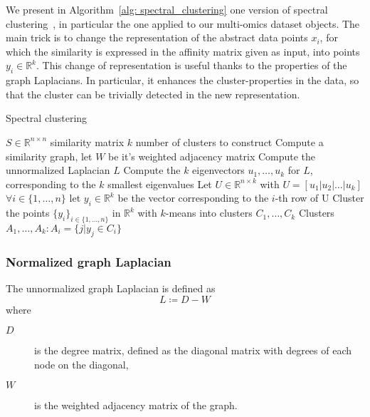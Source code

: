 We present in Algorithm~\ref{alg: spectral_clustering} one version of spectral clustering~\cite{Ng2002spectralClustering}, in particular the one applied to our multi-omics dataset objects. The main trick is to change the representation of the abstract data points $x_i$, for which the similarity is expressed in the affinity matrix given as input, into points $y_i\in\mathbb{R}^k$. This change of representation is useful thanks to the properties of the graph Laplacians. In particular, it enhances the cluster-properties in the data, so that the cluster can be trivially detected in the new representation.
\begin{algorithm}
    \caption{Spectral clustering}
    \label{alg: spectral_clustering}
    \begin{algorithmic}[1]
        \Input
        \Statex $S\in \mathbb{R}^{n\times n}$ similarity matrix
        \Statex $k$ number of clusters to construct
        \EndInput
        \Statex
        \State Compute a similarity graph, let $W$ be it's weighted adjacency matrix \label{alg: spectral_clustering: line2}
        \State Compute the unnormalized Laplacian $L$ \label{alg: spectral_clustering: line3}
        \State Compute the $k$ eigenvectors $u_1,\dots,u_k$ for $L$, corresponding to the $k$ smallest eigenvalues\label{alg: spectral_clustering: line4}
        \State Let $U\in \mathbb{R}^{n\times k}$ with $U=\left[u_1|u_2|\dots|u_k\right]$\label{alg: spectral_clustering: line5}
        \State $\forall i \in \{1,\dots,n\}$ let $y_i\in \mathbb{R}^k$ be the vector corresponding to the $i$-th row of U\label{alg: spectral_clustering: line6}
        \State Cluster the points $\{y_i\}_{i\in\{1,\dots,n\}}$ in $\mathbb{R}^k$ with $k$-means into clusters $C_1,\dots,C_k$\label{alg: spectral_clustering: line7}
        \Statex
        \Output
        \Statex Clusters $A_1,\dots,A_k: A_i=\{j|y_j\in C_i\}$
        \EndOutput
    \end{algorithmic}
\end{algorithm}
\subsubsection*{Normalized graph Laplacian}
The unnormalized graph Laplacian is defined as
\begin{equation*}
    L\coloneqq D-W
\end{equation*}
where
\begin{description}
    \item[\boldmath$D$] is the degree matrix, defined as the diagonal matrix with degrees of each node on the diagonal,
    \item[\boldmath$W$] is the weighted adjacency matrix of the graph.    
\end{description}

